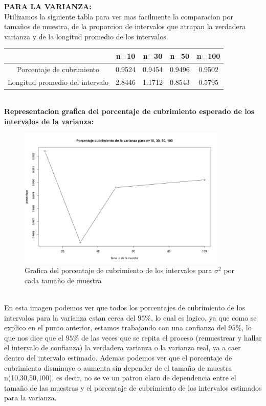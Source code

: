 \documentclass[letterpaper,12pt,onecolumn,titlepage]{article}
\begin{document}
\pagebreak \textbf{PARA LA VARIANZA:}
~\\ Utilizamos la siguiente tabla para ver mas facilmente la comparacion por tama\~{n}os de muestra, de la proporcion de intervalos que atrapan la verdadera varianza y de la longitud promedio de los intervalos.
\begin{center}
\begin{tabular}{|c|c|c|c|c|}
\hline 
\rule[-1ex]{0pt}{2.5ex}  & n=10 & n=30 & n=50 & n=100 \\ 
\hline 
\rule[-1ex]{0pt}{2.5ex} Porcentaje de cubrimiento & 0.9524 & 0.9454 & 0.9496 & 0.9502 \\ 
\hline 
\rule[-1ex]{0pt}{2.5ex} Longitud promedio del intervalo & 2.8446 & 1.1712 & 0.8543 & 0.5795 \\ 
\hline 
\end{tabular} 
\end{center}
~\\\textbf{Representacion grafica del porcentaje de cubrimiento esperado de los intervalos de la varianza:}
~\\ \begin{figure}[!h]
    \begin{center}
        \includegraphics[width=10cm]{Figuras/Pb1.png}
        \caption{Grafica del porcentaje de cubrimiento de los intervalos para $\sigma^2$ por cada tama\~{n}o de muestra}
        \label{fig:Densidad}
    \end{center}
\end{figure}
~\\ En esta imagen podemos ver que todos los porcentajes de cubrimiento de los intervalos para la varianza estan cerca del $95\%$, lo cual es logico, ya que como se explico en el punto anterior, estamos trabajando con una confianza del $95\%$, lo que nos dice que el $95\%$ de las veces que se repita el proceso (remuestrear y hallar el intervalo de confianza) la verdadera varianza o la varianza real, va a caer dentro del intervalo estimado. Ademas podemos ver que el porcentaje de cubrimiento disminuye o aumenta sin depender de el tama\~{n}o de muestra n(10,30,50,100), es decir, no se ve un patron claro de dependencia entre el tama\~{n}o de las muestras y el porcentaje de cubrimiento de los intervalos estimados para la varianza.
\end{document}
